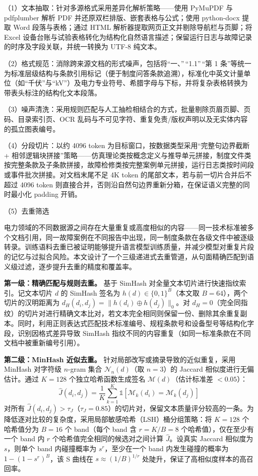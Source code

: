 \documentclass[fontset=fandol,type=master,campus=shenzhen,etitleauto=true]{hithesisbook}
\begin{document}
\noindent （1）文本抽取：针对多源格式采用差异化解析策略——使用 PyMuPDF 与 pdfplumber 解析 PDF 并还原双栏排版、嵌套表格与公式；使用 python-docx 提取 Word 段落与表格；通过 HTML 解析器提取网页正文并剔除导航栏与页脚；将 Excel 设备台账与试验表格转化为结构化自然语言描述；保留运行日志与故障记录的时序及字段关联，并统一转换为 UTF-8 纯文本。

\noindent （2）格式规范：消除跨来源文档的形式噪声，包括将``一、''\,``1.1''\,``第 1 条''等统一为标准层级结构与条款引用标记（便于制度问答条款追溯），标准化中英文计量单位（如``千伏''与``kV''）及电力专业符号、希腊字母与下标，并将复杂表格转换为带表头标注的结构化文本段落。

\noindent （3）噪声清洗：采用规则匹配与人工抽检相结合的方式，批量剔除页眉页脚、页码、目录索引页、OCR 乱码与不可见字符、重复免责/版权声明以及无实体内容的孤立图表编号。

\noindent （4）分段切片：以约 4096 token 为目标窗口，按数据类型采用``完整句边界截断 + 相邻逻辑块拼接''策略——仿真理论类按概念定义与推导单元拼接，制度文件类按完整条款及子条款拼接，故障检修类按完整案例单元拼接，运行日志类按时间段或事件批次拼接。对文档末尾不足 4K token 的尾部文本，若与前一切片合并后不超过 4096 token 则直接合并，否则沿自然句边界重新分箱，在保证语义完整的同时最小化 padding 开销。

\noindent （5）去重筛选

电力领域的不同数据源之间存在大量重复或高度相似的内容------同一技术标准被多个文档引用，同一故障案例在不同报告中出现，同一制度条款在各级文件中被逐级转录。训练语料去重已被证明能够提升语言模型训练质量，并减少模型对重复片段的记忆与过拟合风险\cite{ref57}。本文设计了一个三级递进式去重管道，从句面精确匹配到语义级过滤，逐步提升去重的精度和覆盖率。

\textbf{第一级：精确匹配与规则去重。} 基于 SimHash 对全量文本切片进行快速指纹索引\cite{ref59,ref60}。记文本切片 $d$ 的 SimHash 签名为 $h(d) \in \{0,1\}^{B}$（本文取 $B = 64$），两个切片的汉明距离为 $d_H(d_i, d_j) = \|h(d_i) \oplus h(d_j)\|_0$。对 $d_H = 0$（完全同指纹）的切片对进行精确文本比对，若文本完全相同则保留一份、删除其余重复副本。同时，利用正则表达式匹配技术标准编号、规程条款号和设备型号等结构化字段，识别因格式差异导致 SimHash 指纹不同的内容重复（如同一标准条款在不同文档中被重新编号引用）。

\textbf{第二级：MinHash 近似去重。} 针对局部改写或摘录导致的近似重复，采用 MinHash 对字符级 $n$-gram 集合 $\mathcal{N}_n(d)$（取 $n = 3$）的 Jaccard 相似度进行无偏估计\cite{ref61}。通过 $K = 128$ 个独立哈希函数生成签名 $\mathcal{M}(d)$（估计标准差 $< 0.05$）：
\begin{equation}
\hat{J}(d_i, d_j) = \frac{1}{K} \sum_{k=1}^{K} \mathbb{1}\left[\mathcal{M}_k(d_i) = \mathcal{M}_k(d_j)\right]
\end{equation}
对所有 $\hat{J}(d_i, d_j) > \tau_J$（$\tau_J = 0.85$）的切片对，保留文本质量评分较高的一条。为降低逐对比较的复杂度，采用局部敏感哈希（LSH）桶分组策略\cite{ref62}：将 $K=128$ 个哈希值分为 $B=16$ 个 band（每个 band 含 $r = K/B = 8$ 个哈希值），仅在至少有一个 band 内 $r$ 个哈希值完全相同的候选对之间计算 $\hat{J}$。设真实 Jaccard 相似度为 $s$，则单个 band 内碰撞概率为 $s^r$，至少在一个 band 内发生碰撞的概率为 $1 - (1 - s^r)^B$，该 S 曲线在 $s \approx (1/B)^{1/r}$ 处陡升，保证了高相似度样本的高召回率。
\end{document}
